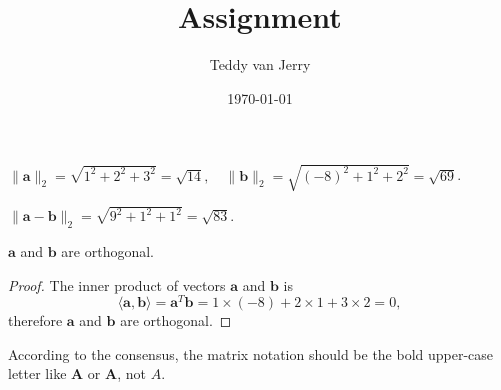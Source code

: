 \documentclass[solution]{seu-ml-assign}
\title{Assignment}
\author{Teddy van Jerry}
\date{\today}
\begin{document}
\maketitle


\subproblem{}
$\|\mathbf{a}\|_2=\sqrt{1^2+2^2+3^2}=\sqrt{14},\quad \|\mathbf{b}\|_2=\sqrt{(-8)^2+1^2+2^2}=\sqrt{69}$.

\subproblem{} 
$\|\mathbf{a}-\mathbf{b}\|_2=\sqrt{9^2+1^2+1^2}=\sqrt{83}$.

\subproblem{}
$\mathbf{a}$ and $\mathbf{b}$ are orthogonal.
\begin{proof}
The inner product of vectors $\mathbf{a}$ and $\mathbf{b}$ is
\begin{equation}
\langle\mathbf{a},\mathbf{b}\rangle=\mathbf{a}^T\mathbf{b}=1\times(-8)+2\times 1+3\times 2=0,
\end{equation}
therefore $\mathbf{a}$ and $\mathbf{b}$ are orthogonal.
\end{proof}

According to the consensus, the matrix notation should be the bold upper-case letter like $\mathbf{A}$ or $\bm{A}$, not $A$.
\end{document}
